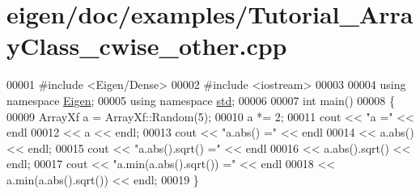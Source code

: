 \hypertarget{eigen_2doc_2examples_2_tutorial___array_class__cwise__other_8cpp_source}{}\section{eigen/doc/examples/\+Tutorial\+\_\+\+Array\+Class\+\_\+cwise\+\_\+other.cpp}
\label{eigen_2doc_2examples_2_tutorial___array_class__cwise__other_8cpp_source}

\begin{DoxyCode}
00001 \textcolor{preprocessor}{#include <Eigen/Dense>}
00002 \textcolor{preprocessor}{#include <iostream>}
00003 
00004 \textcolor{keyword}{using namespace }\hyperlink{namespace_eigen}{Eigen};
00005 \textcolor{keyword}{using namespace }\hyperlink{namespacestd}{std};
00006 
00007 \textcolor{keywordtype}{int} main()
00008 \{
00009   ArrayXf a = ArrayXf::Random(5);
00010   a *= 2;
00011   cout << \textcolor{stringliteral}{"a ="} << endl 
00012        << a << endl;
00013   cout << \textcolor{stringliteral}{"a.abs() ="} << endl 
00014        << a.abs() << endl;
00015   cout << \textcolor{stringliteral}{"a.abs().sqrt() ="} << endl 
00016        << a.abs().sqrt() << endl;
00017   cout << \textcolor{stringliteral}{"a.min(a.abs().sqrt()) ="} << endl 
00018        << a.min(a.abs().sqrt()) << endl;
00019 \}
\end{DoxyCode}
